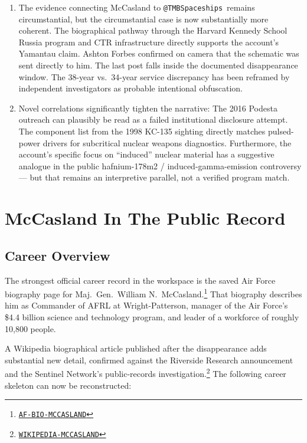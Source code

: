 \documentclass[11pt]{article}
\makeatletter
\newcommand{\account}{\texttt{@TMBSpaceships}}
\newcommand{\src}[2]{\href{#1}{\texttt{#2}}}
\makeatother
\begin{document}
\begin{enumerate}
  \item The evidence connecting McCasland to \account\ remains circumstantial, but the circumstantial case is now substantially more coherent. The biographical pathway through the Harvard Kennedy School Russia program and CTR infrastructure directly supports the account's Yamantau claim. Ashton Forbes confirmed on camera that the schematic was sent directly to him. The last post falls inside the documented disappearance window. The 38-year vs.\ 34-year service discrepancy has been reframed by independent investigators as probable intentional obfuscation.

  \item Novel correlations significantly tighten the narrative: The 2016 Podesta outreach can plausibly be read as a failed institutional disclosure attempt. The component list from the 1998 KC-135 sighting directly matches pulsed-power drivers for subcritical nuclear weapons diagnostics. Furthermore, the account's specific focus on ``induced'' nuclear material has a suggestive analogue in the public hafnium-178m2 / induced-gamma-emission controversy --- but that remains an interpretive parallel, not a verified program match.
\end{enumerate}

\section{McCasland In The Public Record}

\subsection{Career Overview}

The strongest official career record in the workspace is the saved Air Force biography page for Maj.\ Gen.\ William N.\ McCasland.\footnote{\src{https://www.af.mil/About-Us/Biographies/Display/Article/104776/major-general-william-n-mccasland/}{AF-BIO-MCCASLAND}} That biography describes him as Commander of AFRL at Wright-Patterson, manager of the Air Force's \$4.4 billion science and technology program, and leader of a workforce of roughly 10{,}800 people.

A Wikipedia biographical article published after the disappearance adds substantial new detail, confirmed against the Riverside Research announcement and the Sentinel Network's public-records investigation.\footnote{\src{https://en.wikipedia.org/wiki/Neil_McCasland}{WIKIPEDIA-MCCASLAND}} The following career skeleton can now be reconstructed:
\end{document}
